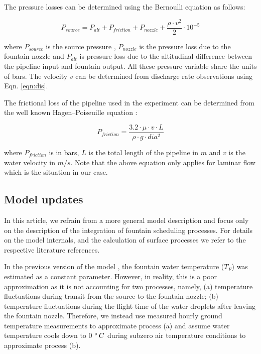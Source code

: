 \documentclass[tc, manuscript]{copernicus}
\begin{document}
The pressure losses can be determined using the Bernoulli equation as follows:

\begin{equation}
  \label{eqn:pressure}
  P_{source} = P_{alt} + P_{friction} + P_{nozzle} + \frac{\rho \cdot v^2}{2} \cdot 10 ^{-5}
\end{equation}

where $P_{source}$ is the source pressure , $P_{nozzle}$ is the pressure loss due to the fountain nozzle and
$P_{alt}$ is pressure loss due to the altitudinal difference between the pipeline input and fountain output. All
these pressure variable share the units of bars.  The velocity $v$ can be determined from discharge rate
observations using Eqn. \ref{eqn:dis}. 

The frictional loss of the pipeline used in the experiment can be determined from the well known
Hagen–Poiseuille equation \cite{poiseuilleExperimentalInvestigationsFlow1847}:  

\begin{equation}
  \label{eqn:friction}
  P_{friction} = \frac{3.2 \cdot \mu \cdot v \cdot L}{\rho \cdot g \cdot dia^2}
\end{equation}

where $P_{friction}$ is in bars, $L$ is the total length of the pipeline in $m$ and $v$ is the water velocity in
$m/s$. Note that the above equation only applies for laminar flow which is the situation in our case.


\subsection{Model updates}

In this article, we refrain from a more general model description and focus only on the
description of the integration of fountain scheduling processes. For details on the model internals, and the
calculation of surface processes we refer to the respective literature references. 

In the previous version of the model \citep{balasubramanianInfluenceMeteorologicalConditions2022}, the fountain
water temperature ($T_F$) was estimated as a constant parameter. However, in reality, this is a poor
approximation as it is not accounting for two processes, namely, (a) temperature fluctuations during transit
from the source to the fountain nozzle; (b) temperature fluctuations during the flight time of the water
droplets after leaving the fountain nozzle. Therefore, we instead use measured hourly ground temperature
measurements to approximate process (a) and assume water temperature cools down to 0 $^{\circ}\,C$ during subzero
air temperature conditions to approximate process (b).
\end{document}
